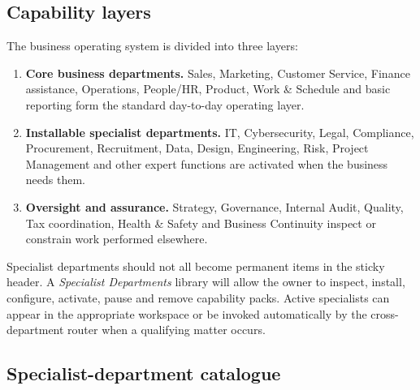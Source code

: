 \subsection{Capability layers}

The business operating system is divided into three layers:

\begin{enumerate}[leftmargin=*]
  \item \textbf{Core business departments.} Sales, Marketing, Customer Service,
        Finance assistance, Operations, People/HR, Product, Work \& Schedule and
        basic reporting form the standard day-to-day operating layer.
  \item \textbf{Installable specialist departments.} IT, Cybersecurity, Legal,
        Compliance, Procurement, Recruitment, Data, Design, Engineering, Risk,
        Project Management and other expert functions are activated when the
        business needs them.
  \item \textbf{Oversight and assurance.} Strategy, Governance, Internal Audit,
        Quality, Tax coordination, Health \& Safety and Business Continuity
        inspect or constrain work performed elsewhere.
\end{enumerate}

Specialist departments should not all become permanent items in the sticky
header.  A \emph{Specialist Departments} library will allow the owner to inspect,
install, configure, activate, pause and remove capability packs.  Active
specialists can appear in the appropriate workspace or be invoked automatically
by the cross-department router when a qualifying matter occurs.

\subsection{Specialist-department catalogue}

